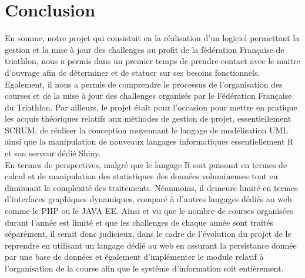 \section* {Conclusion}En somme, notre projet qui consistait en la réalisation d’un logiciel permettant  la gestion et la mise à jour des challenges au profit de la fédération Française de triathlon, nous a permis dans un premier temps de prendre contact avec le maitre d’ouvrage afin de  déterminer et de statuer sur ses besoins fonctionnels. Egalement, il nous a permis de comprendre le processus de l’organisation des courses et de la mise à jour des challenges organisés par le Fédération Française du Triathlon. Par ailleurs, le projet était pour l’occasion pour mettre en pratique les acquis théoriques relatifs aux méthodes de gestion de projet, essentiellement SCRUM, de réaliser la conception moyennant le langage de modélisation UML ainsi   que la manipulation de nouveaux langages informatiques essentiellement R et son serveur dédié Shiny.\\
En termes de perspectives, malgré que le langage R soit puissant en termes de calcul et de manipulation des statistiques des données volumineuses tout en diminuant la complexité des traitements. Néanmoins, il demeure limité en termes d’interfaces graphiques dynamiques, comparé à d’autres langages dédiés au web comme le PHP ou le JAVA EE. Ainsi et vu que le nombre de courses organisées durant l’année est limité et que les challenges de chaque année sont traités séparément, il serait donc judicieux, dans le cadre de l’évolution du projet de le reprendre en utilisant un langage dédié au web en assurant la persistance donnée par une base de données et également d’implémenter le module relatif à l’organisation de la course afin que le système d’information soit entièrement.
